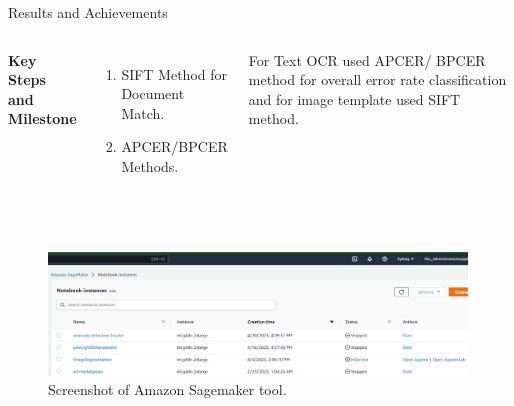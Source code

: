 \documentclass[aspectratio=169,xcolor=dvipsnames]{beamer}
\begin{document}
\begin{frame}{Results and Achievements}
    \tableofcontents
    \begin{columns}[c] %

        \textbf{Key Steps and Milestone}
        \begin{enumerate}
            \item SIFT Method for Document Match.
            \item APCER/BPCER Methods.
        
        \end{enumerate}

         For Text OCR used APCER/ BPCER method for overall error rate classification and for image template used SIFT method.

    \end{columns}   \\

  \begin{figure}
   \includegraphics[width=420]{tool.jpg}
      \caption{Screenshot of Amazon Sagemaker tool.}
\end{figure}

\end{frame}
\end{document}
